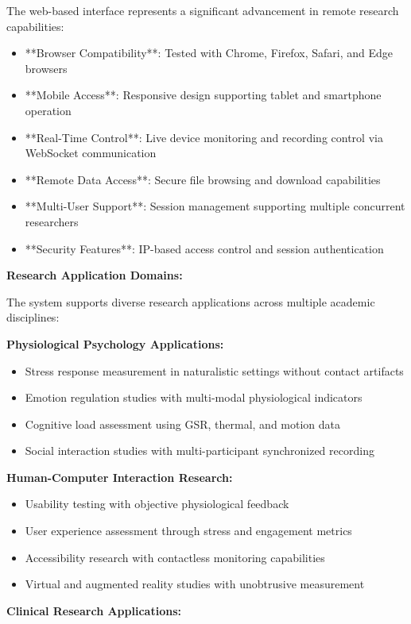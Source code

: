 \documentclass[11pt,a4paper]{article}
\begin{document}
The web-based interface represents a significant advancement in remote research capabilities:

\begin{itemize}
\item **Browser Compatibility**: Tested with Chrome, Firefox, Safari, and Edge browsers
\item **Mobile Access**: Responsive design supporting tablet and smartphone operation
\item **Real-Time Control**: Live device monitoring and recording control via WebSocket communication
\item **Remote Data Access**: Secure file browsing and download capabilities
\item **Multi-User Support**: Session management supporting multiple concurrent researchers
\item **Security Features**: IP-based access control and session authentication

\end{itemize}
\textbf{Research Application Domains:}

The system supports diverse research applications across multiple academic disciplines:

\textbf{Physiological Psychology Applications:}

\begin{itemize}
\item Stress response measurement in naturalistic settings without contact artifacts
\item Emotion regulation studies with multi-modal physiological indicators
\item Cognitive load assessment using GSR, thermal, and motion data
\item Social interaction studies with multi-participant synchronized recording

\end{itemize}
\textbf{Human-Computer Interaction Research:}

\begin{itemize}
\item Usability testing with objective physiological feedback
\item User experience assessment through stress and engagement metrics
\item Accessibility research with contactless monitoring capabilities
\item Virtual and augmented reality studies with unobtrusive measurement

\end{itemize}
\textbf{Clinical Research Applications:}
\end{document}
